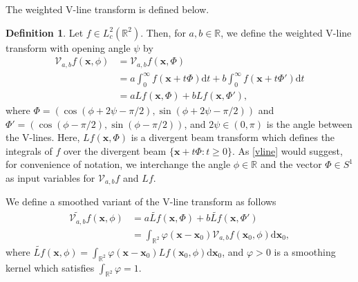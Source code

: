 \documentclass[a4paper,12pt]{amsart}
\numberwithin{equation}{section}
\theoremstyle{plain}
\numberwithin{theorem}{section}
\theoremstyle{definition}
\newtheorem{definition}[theorem]{Definition}
\theoremstyle{remark}
\theoremstyle{remark}
\theoremstyle{remark}
\newcommand{\vx}{{\mathbf{x}}}
\begin{document}



\noindent The weighted V-line transform \cite{mishra2025tensor} is defined below.

\begin{definition}\label{vline_def}
Let $f \in L^2_c(\mathbb{R}^2)$. Then, for $a,b\in\mathbb{R}$, we define the weighted V-line transform with opening angle $\psi$ by
\begin{equation}
\label{vline}
\begin{split}
\mathcal{V}_{a,b}f(\vx,\phi) &= \mathcal{V}_{a,b}f(\vx, \Phi) \\
&= a\int_0^\infty f(\vx + t \Phi) \mathrm{d}t + b \int_0^\infty f( \vx + t \Phi' ) \mathrm{d}t\\
&= aLf(\vx,\Phi) +b Lf(\vx,\Phi'),
\end{split}
\end{equation}
where $\Phi = (\cos(\phi + 2\psi - \pi/2),\sin(\phi + 2\psi - \pi/2))$ and $\Phi' = (\cos(\phi - \pi/2),\sin(\phi - \pi/2))$, and $2\psi \in (0,\pi)$ is the angle between the V-lines. Here, $Lf(\vx,\Phi)$ is a divergent beam transform \cite{hamaker1980divergent} which defines the integrals of $f$ over the divergent beam $\{\vx + t\Phi : t \geq0 \}$. As \eqref{vline} would suggest, for convenience of notation, we interchange the angle $\phi \in \mathbb{R}$ and the vector $\Phi\in S^1$ as input variables for $\mathcal{V}_{a,b}f$ and $Lf$.

We define a smoothed variant of the V-line transform as follows
\begin{equation} \label{smoothvline}
\begin{split}
\widetilde{ \mathcal{V}_{a,b}} f(\vx,\phi) &= a\widetilde{Lf}(\vx,\Phi) +b \widetilde{Lf}(\vx,\Phi')\\
&= \int_{\mathbb{R}^2}\varphi(\vx - \vx_0) \mathcal{V}_{a,b} f(\vx_0,\phi) \mathrm{d}\vx_0,
\end{split}
\end{equation}
where $\widetilde{Lf}(\vx,\phi) = \int_{\mathbb{R}^2} \varphi(\vx  -\vx_0) Lf(\vx_0,\phi) \mathrm{d}\vx_0$, and $\varphi > 0$ is a smoothing kernel which satisfies $\int_{\mathbb{R}^2}\varphi = 1$.
\end{definition}
\end{document}
